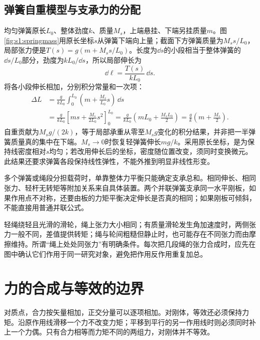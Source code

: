 \subsection{弹簧自重模型与支承力的分配}
均匀弹簧原长$L_0$、整体劲度$k$、质量$M_s$，上端悬挂、下端另挂质量$m$。图\ref{fig:s1:springmass}用原长坐标$s$从弹簧下端向上量；截面下方弹簧质量为$M_ss/L_0$，局部张力便是$T(s)=g(m+M_ss/L_0)$。长度为$\dd s$的小段相当于整体弹簧的$\dd s/L_0$部分，劲度为$kL_0/\dd s$，所以局部伸长为
\[
\dd\ell=\frac{T(s)}{kL_0}\,\dd s.
\]
将各小段伸长相加，分别积分常量和一次项：
\begin{align*}
\Delta L&=\frac{g}{kL_0}\int_0^{L_0}
\left(m+\frac{M_s}{L_0}s\right)\,\dd s\\
&=\frac{g}{kL_0}\left[ms+\frac{M_s}{2L_0}s^2\right]_0^{L_0}
=\frac{g}{kL_0}\left(mL_0+\frac{M_sL_0}{2}\right)
=\frac{g}{k}\left(m+\frac{M_s}{2}\right).
\end{align*}
自重贡献为$M_sg/(2k)$，等于局部承重从零至$M_sg$变化的积分结果，并非把一半弹簧质量真的集中在下端。$M_s\to0$时恢复轻弹簧伸长$mg/k$。采用原长坐标，是为保持线密度相对$s$均匀；若改用伸长后的坐标，密度随位置改变，须同时变换微元。此结果还要求弹簧各段保持线性弹性，不能外推到明显非线性形变。

多个弹簧或绳段分担载荷时，单靠整体力平衡只能确定支承总和。相同伸长、相同张力、轻杆无转矩等附加关系来自具体装置。两个并联弹簧支承同一水平刚板，如果作用点不对称，还要由板的力矩平衡决定伸长是否真的相同；如果刚板可倾斜，不能直接用普通并联公式。

轻绳绕轻且光滑的滑轮，绳上张力大小相同；有质量滑轮发生角加速度时，两侧张力一般不同，差值提供转矩；绳与轮间粗糙但静止时，也可能存在不同张力而由摩擦维持。所谓“绳上处处同张力”有明确条件。每次把几段绳的张力合成时，应先在图中确认它们作用于同一研究对象，避免把作用反作用重复加总。


\section{力的合成与等效的边界}
对质点，合力按矢量相加，正交分量可以逐项相加。对刚体，等效还必须保持力矩。沿原作用线滑移一个力不改变力矩；平移到平行的另一作用线时则必须同时补上一个力偶。只有合力相等而力矩不同的两组力，对刚体并不等效。

